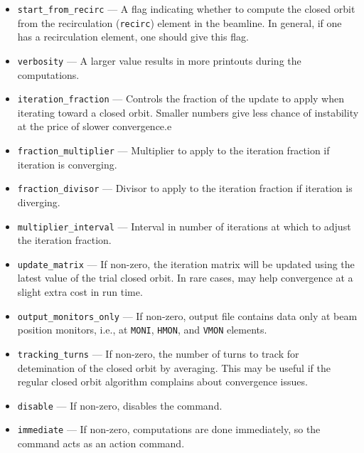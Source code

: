 \documentclass[11pt]{article}
\begin{document}
\begin{itemize}
\begin{itemize}
  This mode is robust but can be slow and sometimes converges poorly.
\item \verb|2| --- Full 6-D closed orbit found with a single coupled Newton iteration. It solves
  the transverse orbit, the momentum offset $\delta$, and the rf timing/synchronous phase
  simultaneously, subject to the path-length (fixed-length) constraint, tracking the probe with
  rf time-dependence active. This is generally faster and more robust than \verb|fixed_length=1|.
  It requires an rf cavity that provides longitudinal focusing (i.e. a non-singular $I-R$ in the
  longitudinal plane); with no rf configured the computation is aborted. During this solve the
  \verb|change_t| setting of each rf cavity is internally forced to zero (and restored afterward) so
  that the path-length coordinate is tracked as the absolute orbit length; unlike \verb|fixed_length=1|,
  a nonzero \verb|change_t| is therefore permitted.
\end{itemize}
\item \verb|start_from_recirc| --- A flag indicating whether to
compute the closed orbit from the recirculation (\verb|recirc|)
element in the beamline.  In general, if one has a recirculation
element, one should give this flag.
\item \verb|verbosity| --- A larger value results in more printouts
during the computations.
\item \verb|iteration_fraction| --- Controls the fraction of the update to apply
  when iterating toward a closed orbit. Smaller numbers give less chance of instability
  at the price of slower convergence.e
\item \verb|fraction_multiplier| --- Multiplier to apply to the iteration fraction if
  iteration is converging.
\item \verb|fraction_divisor| --- Divisor to apply to the iteration fraction if
  iteration is diverging.
\item \verb|multiplier_interval| --- Interval in number of iterations at which to adjust
  the iteration fraction.
\item \verb|update_matrix| --- If non-zero, the iteration matrix will be updated using the latest
  value of the trial closed orbit. In rare cases, may help convergence at a slight extra cost in run time.
\item \verb|output_monitors_only|  --- If non-zero, output file contains data only at beam position monitors,
  i.e., at \verb|MONI|, \verb|HMON|, and \verb|VMON| elements.
\item \verb|tracking_turns| --- If non-zero, the number of turns to track for detemination 
  of the closed orbit by averaging. This may be useful if the regular closed orbit algorithm
  complains about convergence issues.
\item \verb|disable| --- If non-zero, disables the command.
\item \verb|immediate| --- If non-zero, computations are done immediately, so the command acts as an
  action command.
\end{itemize}
\end{document}

